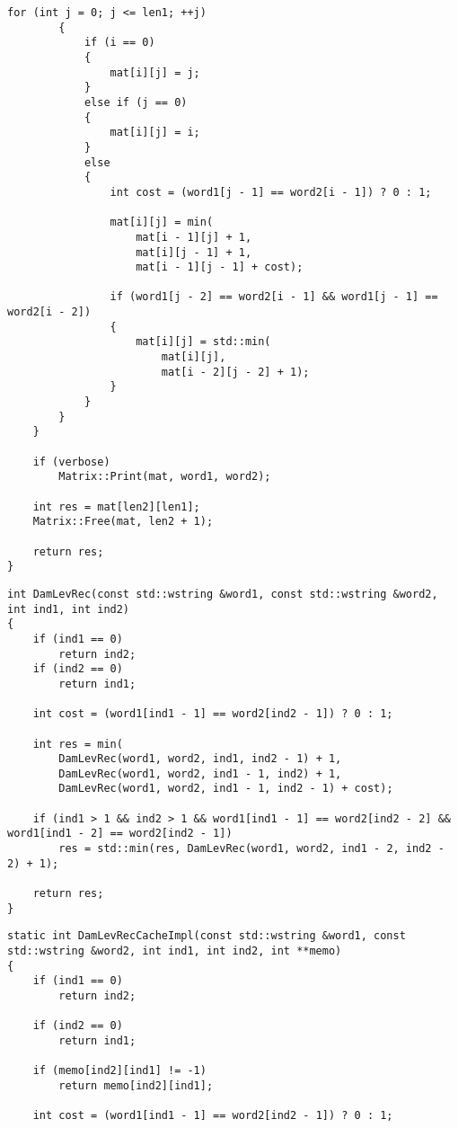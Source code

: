 \begin{lstlisting}[caption=Матричный алгоритм поиска расстояния Дамерау\,--\,Левенштейна (часть 2)]
        for (int j = 0; j <= len1; ++j)
        {
            if (i == 0)
            {
                mat[i][j] = j;
            }
            else if (j == 0)
            {
                mat[i][j] = i;
            }
            else
            {
                int cost = (word1[j - 1] == word2[i - 1]) ? 0 : 1;

                mat[i][j] = min(
                    mat[i - 1][j] + 1,
                    mat[i][j - 1] + 1,
                    mat[i - 1][j - 1] + cost);

                if (word1[j - 2] == word2[i - 1] && word1[j - 1] == word2[i - 2])
                {
                    mat[i][j] = std::min(
                        mat[i][j],
                        mat[i - 2][j - 2] + 1);
                }
            }
        }
    }

    if (verbose)
        Matrix::Print(mat, word1, word2);

    int res = mat[len2][len1];
    Matrix::Free(mat, len2 + 1);

    return res;
}
\end{lstlisting}

\begin{lstlisting}[caption=Рекурсивный алгоритм поиска расстояния Дамерау\,--\,Левенштейна]
int DamLevRec(const std::wstring &word1, const std::wstring &word2, int ind1, int ind2)
{
    if (ind1 == 0)
        return ind2;
    if (ind2 == 0)
        return ind1;

    int cost = (word1[ind1 - 1] == word2[ind2 - 1]) ? 0 : 1;

    int res = min(
        DamLevRec(word1, word2, ind1, ind2 - 1) + 1,
        DamLevRec(word1, word2, ind1 - 1, ind2) + 1,
        DamLevRec(word1, word2, ind1 - 1, ind2 - 1) + cost);

    if (ind1 > 1 && ind2 > 1 && word1[ind1 - 1] == word2[ind2 - 2] && word1[ind1 - 2] == word2[ind2 - 1])
        res = std::min(res, DamLevRec(word1, word2, ind1 - 2, ind2 - 2) + 1);

    return res;
}
\end{lstlisting}

\begin{lstlisting}[caption=Рекурсивный алгоритм поиска расстояния Дамерау\,--\,Левенштейна с кэшированием (реализация) (часть 1)]
static int DamLevRecCacheImpl(const std::wstring &word1, const std::wstring &word2, int ind1, int ind2, int **memo)
{
    if (ind1 == 0)
        return ind2;

    if (ind2 == 0)
        return ind1;

    if (memo[ind2][ind1] != -1)
        return memo[ind2][ind1];
    
    int cost = (word1[ind1 - 1] == word2[ind2 - 1]) ? 0 : 1;
\end{lstlisting}

